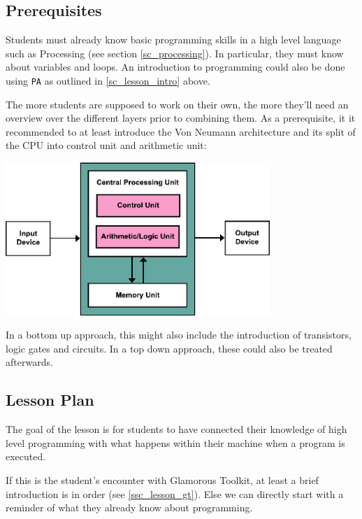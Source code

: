 \subsection{Prerequisites}
Students must already know basic programming skills in a high level language such as Processing (see section \ref{sc_processing}). In particular, they must know about variables and loops. An introduction to programming could also be done using \texttt{PA} as outlined in \ref{sc_lesson_intro} above.

The more students are supposed to work on their own, the more they'll need an overview over the different layers prior to combining them. As a prerequisite, it it recommended to at least introduce the Von Neumann architecture and its split of the CPU into control unit and arithmetic unit:

\begin{center}
\includegraphics[width=10cm]{images/Von_Neumann_Architecture.pdf}
\\ 
\end{center}

In a bottom up approach, this might also include the introduction of transistors, logic gates and circuits. In a top down approach, these could also be treated afterwards.


\subsection{Lesson Plan}

The goal of the lesson is for students to have connected their knowledge of high level programming with what happens within their machine when a program is executed.

If this is the student's encounter with Glamorous Toolkit, at least a brief introduction is in order (see \ref{ssc_lesson_gt}). Else we can directly start with a reminder of what they already know about programming.





